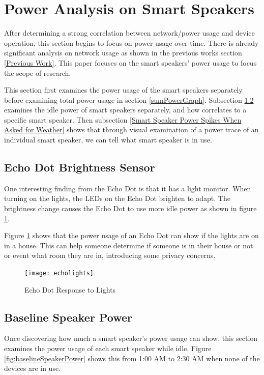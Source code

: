 \section{Power Analysis on Smart Speakers}
\label{Power Analysis on Smart Speakers}

After determining a strong correlation between network/power usage and device operation, this section begins to focus on power usage over time. There is already significant analysis on network usage as shown in the previous works section \ref{Previous Work}. This paper focuses on the smart speakers' power usage to focus the scope of research.

This section first examines the power usage of the smart speakers separately before examining total power usage in section \ref{sumPowerGraph}. Subsection \ref{Baseline Speaker Power} examines the idle power of smart speakers separately, and how correlates to a specific smart speaker. Then subsection \ref{Smart Speaker Power Spikes When Asked for Weather} shows that through visual examination of a power trace of an individual smart speaker, we can tell what smart speaker is in use.

\subsection{Echo Dot Brightness Sensor}
\label{Echo Dot Brightness Sensor}
One interesting finding from the Echo Dot is that it has a light monitor. When turning on the lights, the LEDs on the Echo Dot brighten to adapt. The brightness change causes the Echo Dot to use more idle power as shown in figure \ref{fig:echolights}.

Figure \ref{fig:echolights} shows that the power usage of an Echo Dot can show if the lights are on in a house. This can help someone determine if someone is in their house or not or event what room they are in, introducing some privacy concerns.

\begin{figure}[H]
    \centering
    \texttt{[image: echolights]}
    \caption{Echo Dot Response to Lights}
    \label{fig:echolights}
\end{figure}

\subsection{Baseline Speaker Power}
\label{Baseline Speaker Power}
Once discovering how much a smart speaker's power usage can show, this section examines the power usage of each smart speaker while idle. Figure \ref{fig:baselineSpeakerPower} shows this from 1:00 AM to 2:30 AM when none of the devices are in use.

